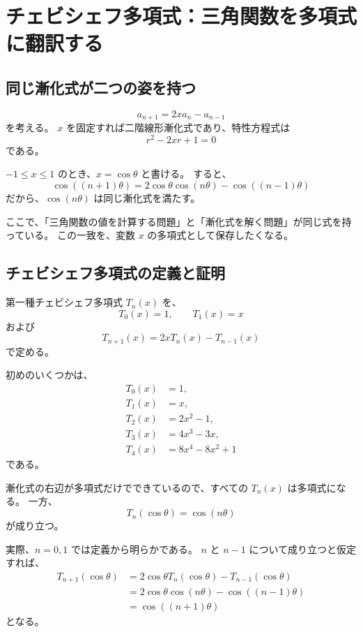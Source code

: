 
\section{チェビシェフ多項式：三角関数を多項式に翻訳する}

\subsection{同じ漸化式が二つの姿を持つ}

\[
  a_{n+1}=2x a_n-a_{n-1}
\]
を考える。
$x$ を固定すれば二階線形漸化式であり、特性方程式は
\[
  r^2-2xr+1=0
\]
である。

$-1\leq x\leq1$ のとき、$x=\cos\theta$ と書ける。
すると、
\[
  \cos((n+1)\theta)
  =
  2\cos\theta\cos(n\theta)-\cos((n-1)\theta)
\]
だから、$\cos(n\theta)$ は同じ漸化式を満たす。

ここで、「三角関数の値を計算する問題」と「漸化式を解く問題」が同じ式を持っている。
この一致を、変数 $x$ の多項式として保存したくなる。

\subsection{チェビシェフ多項式の定義と証明}

第一種チェビシェフ多項式 $T_n(x)$ を、
\[
  T_0(x)=1,\qquad T_1(x)=x
\]
および
\[
  T_{n+1}(x)=2xT_n(x)-T_{n-1}(x)
\]
で定める。

初めのいくつかは、
\[
  \begin{aligned}
    T_0(x) & =1,          \\
    T_1(x) & =x,          \\
    T_2(x) & =2x^2-1,     \\
    T_3(x) & =4x^3-3x,    \\
    T_4(x) & =8x^4-8x^2+1
  \end{aligned}
\]
である。

漸化式の右辺が多項式だけでできているので、すべての $T_n(x)$ は多項式になる。
一方、
\[
  T_n(\cos\theta)=\cos(n\theta)
\]
が成り立つ。

実際、$n=0,1$ では定義から明らかである。
$n$ と $n-1$ について成り立つと仮定すれば、
\[
  \begin{aligned}
    T_{n+1}(\cos\theta)
     & =2\cos\theta T_n(\cos\theta)-T_{n-1}(\cos\theta) \\
     & =2\cos\theta\cos(n\theta)-\cos((n-1)\theta)      \\
     & =\cos((n+1)\theta)
  \end{aligned}
\]
となる。

